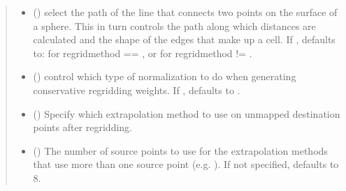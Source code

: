 \documentclass[letterpaper,10pt,english]{sphinxmanual}
\begin{document}
\begin{fulllineitems}
\begin{quote}
\begin{description}
\begin{itemize}
\item {} 
 ({\hyperref[\detokenize{LineType:ESMF.api.constants.LineType}]{}}) \textendash{} select the path of the line that connects two
points on the surface of a sphere.  This in turn controls the path along
which distances are calculated and the shape of the edges that make up a
cell.  If , defaults to:
{\hyperref[\detokenize{LineType:ESMF.api.constants.LineType.GREAT_CIRCLE}]{}} for
regridmethod == {\hyperref[\detokenize{RegridMethod:ESMF.api.constants.RegridMethod.CONSERVE}]{}}, or
{\hyperref[\detokenize{LineType:ESMF.api.constants.LineType.CART}]{}} for
regridmethod != {\hyperref[\detokenize{RegridMethod:ESMF.api.constants.RegridMethod.CONSERVE}]{}}.

\item {} 
 ({\hyperref[\detokenize{NormType:ESMF.api.constants.NormType}]{}}) \textendash{} control which type of normalization to do when
generating conservative regridding weights. If , defaults to
{\hyperref[\detokenize{NormType:ESMF.api.constants.NormType.DSTAREA}]{}}.

\item {} 
 ({\hyperref[\detokenize{ExtrapMethod:ESMF.api.constants.ExtrapMethod}]{}}) \textendash{} Specify which extrapolation method to use on 
unmapped destination points after regridding.

\item {} 
 () \textendash{} The number of source points to use for the 
extrapolation methods that use more than one source point 
(e.g. {\hyperref[\detokenize{ExtrapMethod:ESMF.api.constants.ExtrapMethod.NEAREST_IDAVG}]{}}). If not 
specified, defaults to 8.


\end{itemize}
\end{description}
\end{quote}
\end{fulllineitems}
\end{document}
